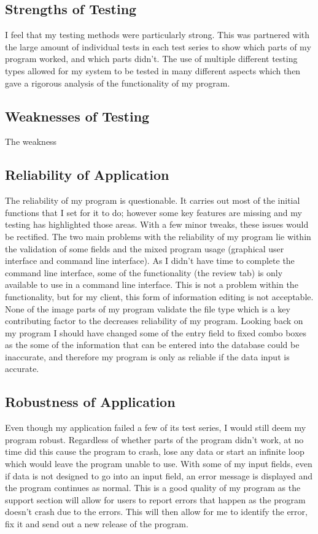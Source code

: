 \subsection{Strengths of Testing}

I feel that my testing methods were particularly strong. This was partnered with the large amount of individual tests in each test series to show which parts of my program worked, and which parts didn't. The use of multiple different testing types allowed for my system to be tested in many different aspects which then gave a rigorous analysis of the functionality of my program.

\subsection{Weaknesses of Testing}

The weakness 

\subsection{Reliability of Application}

The reliability of my program is questionable. It carries out most of the initial functions that I set for it to do; however some key features are missing and my testing has highlighted those areas. With a few minor tweaks, these issues would be rectified. The two main problems with the reliability of my program lie within the validation of some fields and the mixed program usage (graphical user interface and command line interface). As I didn't have time to complete the command line interface, some of the functionality (the review tab) is only available to use in a command line interface. This is not a problem within the functionality, but for my client, this form of information editing is not acceptable. None of the image parts of my program validate the file type which is a key contributing factor to the decreases reliability of my program. Looking back on my program I should have changed some of the entry field to fixed combo boxes as the some of the information that can be entered into the database could be inaccurate, and therefore my program is only as reliable if the data input is accurate.

\subsection{Robustness of Application}

Even though my application failed a few of its test series, I would still deem my program robust. Regardless of whether parts of the program didn't work, at no time did this cause the program to crash, lose any data or start an infinite loop which would leave the program unable to use. With some of my input fields, even if data is not designed to go into an input field, an error message is displayed and the program continues as normal. This is a good quality of my program as the support section will allow for users to report errors that happen as the program doesn't crash due to the errors. This will then allow for me to identify the error, fix it and send out a new release of the program.